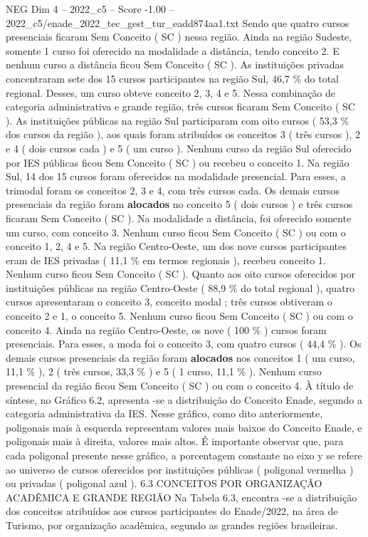 \begin{textsample}{NEG Dim 4 – 2022\_c5 – Score -1.00 – 2022\_c5/enade\_2022\_tec\_gest\_tur\_eadd874aa1.txt}
Sendo que quatro cursos presenciais ficaram Sem Conceito ( SC ) nessa região.
Ainda na região Sudeste, somente 1 curso foi oferecido na modalidade a distância, tendo conceito 2.
E nenhum curso a distância ficou Sem Conceito ( SC ).
As instituições privadas concentraram sete dos 15 cursos participantes na região Sul, 46,7 \% do total regional.
Desses, um curso obteve conceito 2, 3, 4 e 5.
Nessa combinação de categoria administrativa e grande região, três cursos ficaram Sem Conceito ( SC ).
As instituições públicas na região Sul participaram com oito cursos ( 53,3 \% dos cursos da região ), aos quais foram atribuídos os conceitos 3 ( três cursos ), 2 e 4 ( dois cursos cada ) e 5 ( um curso ).
Nenhum curso da região Sul oferecido por IES públicas ficou Sem Conceito ( SC ) ou recebeu o conceito 1.
Na região Sul, 14 dos 15 cursos foram oferecidos na modalidade presencial.
Para esses, a trimodal foram os conceitos 2, 3 e 4, com três cursos cada.
Os demais cursos presenciais da região foram \textbf{alocados} no conceito 5 ( dois cursos ) e três cursos ficaram Sem Conceito ( SC ).
Na modalidade a distância, foi oferecido somente um curso, com conceito 3.
Nenhum curso ficou Sem Conceito ( SC ) ou com o conceito 1, 2, 4 e 5.
Na região Centro-Oeste, um dos nove cursos participantes eram de IES privadas ( 11,1 \% em termos regionais ), recebeu conceito 1.
Nenhum curso ficou Sem Conceito ( SC ).
Quanto aos oito cursos oferecidos por instituições públicas na região Centro-Oeste ( 88,9 \% do total regional ), quatro cursos apresentaram o conceito 3, conceito modal ; três cursos obtiveram o conceito 2 e 1, o conceito 5.
Nenhum curso ficou Sem Conceito ( SC ) ou com o conceito 4.
Ainda na região Centro-Oeste, os nove ( 100 \% ) cursos foram presenciais.
Para esses, a moda foi o conceito 3, com quatro cursos ( 44,4 \% ).
Os demais cursos presenciais da região foram \textbf{alocados} nos conceitos 1 ( um curso, 11,1 \% ), 2 ( três cursos, 33,3 \% ) e 5 ( 1 curso, 11,1 \% ).
Nenhum curso presencial da região ficou Sem Conceito ( SC ) ou com o conceito 4.
À título de síntese, no Gráfico 6.2, apresenta -se a distribuição do Conceito Enade, segundo a categoria administrativa da IES.
Nesse gráfico, como dito anteriormente, poligonais mais à esquerda representam valores mais baixos do Conceito Enade, e poligonais mais à direita, valores mais altos.
É importante observar que, para cada poligonal presente nesse gráfico, a porcentagem constante no eixo y se refere ao universo de cursos oferecidos por instituições públicas ( poligonal vermelha ) ou privadas ( poligonal azul ). 6.3 CONCEITOS POR ORGANIZAÇÃO ACADÊMICA E GRANDE REGIÃO Na Tabela 6.3, encontra -se a distribuição dos conceitos atribuídos aos cursos participantes do Enade/2022, na área de Turismo, por organização acadêmica, segundo as grandes regiões brasileiras.

\end{textsample}
